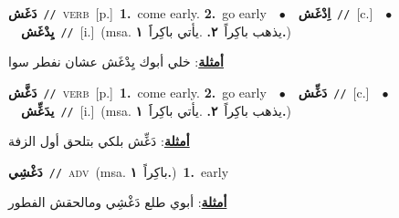 \documentclass[10pt,a4paper,twoside]{article} %
\begin{document}
\begin{multicols}{2}
{\setlength\topsep{0pt}\textbf{\foreignlanguage{arabic}{دَغَش}}\ {\color{gray}\texttt{//}\color{black}}\ \textsc{verb}\ [p.]\ \textbf{1.}~come early.  \textbf{2.}~go early\ \ $\bullet$\ \ \setlength\topsep{0pt}\textbf{\foreignlanguage{arabic}{اِدْغَش}}\ {\color{gray}\texttt{//}\color{black}}\ [c.]\ \ $\bullet$\ \ \setlength\topsep{0pt}\textbf{\foreignlanguage{arabic}{يِدْغَش}}\ {\color{gray}\texttt{//}\color{black}}\ [i.]\ \color{gray}(msa. \foreignlanguage{arabic}{يذهب باكِراً}~\foreignlanguage{arabic}{\textbf{٢.}}  .\foreignlanguage{arabic}{يأتي باكِراََ}~\foreignlanguage{arabic}{\textbf{١.}})\color{black}\  \begin{flushright}\color{gray}\foreignlanguage{arabic}{\textbf{\underline{\foreignlanguage{arabic}{أمثلة}}}: خلي أبوك يِدْغَش عشان نفطر سوا}\end{flushright}\color{black}} \vspace{2mm}

{\setlength\topsep{0pt}\textbf{\foreignlanguage{arabic}{دَغَّش}}\ {\color{gray}\texttt{//}\color{black}}\ \textsc{verb}\ [p.]\ \textbf{1.}~come early.  \textbf{2.}~go early\ \ $\bullet$\ \ \setlength\topsep{0pt}\textbf{\foreignlanguage{arabic}{دَغِّش}}\ {\color{gray}\texttt{//}\color{black}}\ [c.]\ \ $\bullet$\ \ \setlength\topsep{0pt}\textbf{\foreignlanguage{arabic}{يدَغِّش}}\ {\color{gray}\texttt{//}\color{black}}\ [i.]\ \color{gray}(msa. \foreignlanguage{arabic}{يذهب باكِراً}~\foreignlanguage{arabic}{\textbf{٢.}}  .\foreignlanguage{arabic}{يأتي باكِراََ}~\foreignlanguage{arabic}{\textbf{١.}})\color{black}\  \begin{flushright}\color{gray}\foreignlanguage{arabic}{\textbf{\underline{\foreignlanguage{arabic}{أمثلة}}}: دَغِّش بلكي بتلحق أول الزفة}\end{flushright}\color{black}} \vspace{2mm}

{\setlength\topsep{0pt}\textbf{\foreignlanguage{arabic}{دَغْشِي}}\ {\color{gray}\texttt{//}\color{black}}\ \textsc{adv}\ \color{gray}(msa. \foreignlanguage{arabic}{باكِراً}~\foreignlanguage{arabic}{\textbf{١.}})\color{black}\ \textbf{1.}~early\  \begin{flushright}\color{gray}\foreignlanguage{arabic}{\textbf{\underline{\foreignlanguage{arabic}{أمثلة}}}: أبوي طلع دَغْشِي ومالحقش الفطور}\end{flushright}\color{black}} \vspace{2mm}


\end{multicols}
\end{document}
